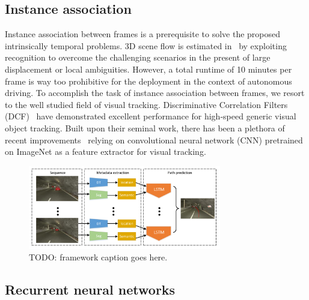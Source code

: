 \documentclass[10pt,twocolumn,letterpaper]{article}
\begin{document}
\subsection{Instance association}
Instance association between frames is a prerequisite to solve the proposed intrinsically temporal problems.  3D scene flow is estimated in~\cite{behl2017bounding} by exploiting recognition to overcome the challenging scenarios in the present of large displacement or local ambiguities.
However, a total runtime of 10 minutes per frame is way too prohibitive for the deployment in the context of autonomous driving.
To accomplish the task of instance association between frames, we resort to the well studied field of visual tracking.
Discriminative Correlation Filters (DCF)~\cite{henriques2015high} have demonstrated excellent performance for high-speed generic visual object tracking.
Built upon their seminal work, there has been a plethora of recent improvements~\cite{wang2016stct, wang2015visual, hong2015online, ma2015hierarchical,danelljan2016beyond,held2016learning, wu2017kernalised,danelljan2017eco} relying on convolutional neural network (CNN) pretrained on ImageNet as a feature extractor for visual tracking.

\begin{figure}[t]
        \centering
        \includegraphics[width=0.75\textwidth]{figures/framework.pdf}
        \caption{ {\small TODO: framework caption goes here.}}
        \label{fig:framework}
\end{figure}


\subsection{Recurrent neural networks}
\end{document}
